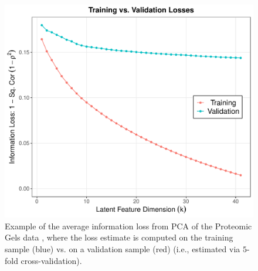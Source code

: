 \begin{figure}
    \centering
    \includegraphics[width=0.5\linewidth]{figures/training-validation.pdf}
    \caption{Example of the average information loss from PCA of the Proteomic Gels data \parencite{morris_pinnacle_2008}, where the loss estimate is computed on the training sample (blue) vs. on a validation sample (red) (i.e., estimated via $5$-fold cross-validation).}
    \label{fig:training-validation}
\end{figure}

